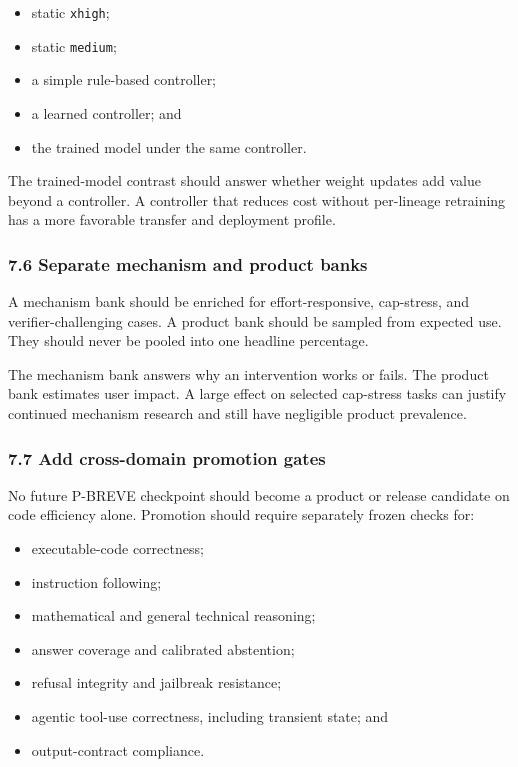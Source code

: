 \documentclass[
  9pt,
  letterpaper,
]{article}
\providecommand{\tightlist}{%
  \setlength{\itemsep}{0pt}\setlength{\parskip}{0pt}}
\begin{document}
\begin{itemize}
\tightlist
\item
  static \texttt{xhigh};
\item
  static \texttt{medium};
\item
  a simple rule-based controller;
\item
  a learned controller; and
\item
  the trained model under the same controller.
\end{itemize}

The trained-model contrast should answer whether weight updates add
value beyond a controller. A controller that reduces cost without
per-lineage retraining has a more favorable transfer and deployment
profile.

\hypertarget{76-separate-mechanism-and-product-banks}{%
\subsubsection{7.6 Separate mechanism and product
banks}\label{76-separate-mechanism-and-product-banks}}

A mechanism bank should be enriched for effort-responsive, cap-stress,
and verifier-challenging cases. A product bank should be sampled from
expected use. They should never be pooled into one headline percentage.

The mechanism bank answers why an intervention works or fails. The
product bank estimates user impact. A large effect on selected
cap-stress tasks can justify continued mechanism research and still have
negligible product prevalence.

\hypertarget{77-add-cross-domain-promotion-gates}{%
\subsubsection{7.7 Add cross-domain promotion
gates}\label{77-add-cross-domain-promotion-gates}}

No future P-BREVE checkpoint should become a product or release
candidate on code efficiency alone. Promotion should require separately
frozen checks for:

\begin{itemize}
\tightlist
\item
  executable-code correctness;
\item
  instruction following;
\item
  mathematical and general technical reasoning;
\item
  answer coverage and calibrated abstention;
\item
  refusal integrity and jailbreak resistance;
\item
  agentic tool-use correctness, including transient state; and
\item
  output-contract compliance.
\end{itemize}
\end{document}
